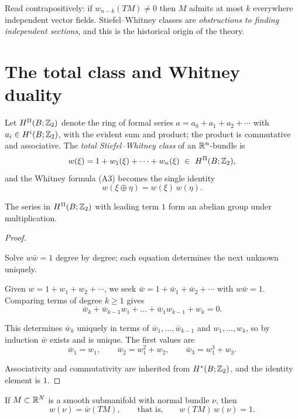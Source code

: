 \begin{remark}
Read contrapositively: if $w_{n-k}(TM)\neq0$ then $M$ admits at most $k$
everywhere independent vector fields. Stiefel--Whitney classes are
\emph{obstructions to finding independent sections}, and this is the historical
origin of the theory.
\end{remark}

\section{The total class and Whitney duality}

Let $H^{\Pi}(B;\mathbb{Z}_2)$ denote the ring of formal series
$a=a_0+a_1+a_2+\cdots$ with $a_i\in H^i(B;\mathbb{Z}_2)$, with the evident sum and
product; the product is commutative and associative. The \emph{total
Stiefel--Whitney class} of an $\mathbb{R}^n$-bundle is
\[
w(\xi)=1+w_1(\xi)+\dots+w_n(\xi)\ \in\ H^{\Pi}(B;\Z_2),
\]
and the Whitney formula (A3) becomes the single identity
\[
w(\xi\oplus\eta)=w(\xi)\,w(\eta).
\]

\begin{proposition}\label{prop:invertible}
The series in $H^\Pi(B;\mathbb{Z}_2)$ with leading term $1$ form an abelian group under
multiplication.
\end{proposition}

\begin{proof}
\begin{strategy}
Solve $w\bar w=1$ degree by degree; each equation determines the next unknown
uniquely.
\end{strategy}

 Given $w=1+w_1+w_2+\cdots$, we seek $\bar w=1+\bar w_1+\bar w_2+\cdots$
with $w\bar w=1$. Comparing terms of degree $k\ge1$ gives
\[
\bar w_k+\bar w_{k-1}w_1+\dots+\bar w_1 w_{k-1}+w_k=0 .
\]

 This determines $\bar w_k$ uniquely in terms of $\bar w_1,\dots,
\bar w_{k-1}$ and $w_1,\dots,w_k$, so by induction $\bar w$ exists and is
unique. The first values are
\[
\bar w_1=w_1,
\qquad
\bar w_2=w_1^2+w_2,
\qquad
\bar w_3=w_1^3+w_3 .
\]

 Associativity and commutativity are inherited from
$H^*(B;\mathbb{Z}_2)$, and the identity element is $1$.
\end{proof}

\begin{lemma}\label{lem:whitney-duality}
If $M\subset\mathbb{R}^N$ is a smooth submanifold with normal bundle $\nu$, then
\[
w(\nu)=\bar w(TM),
\qquad\text{that is,}\qquad
w(TM)\,w(\nu)=1 .
\]
\end{lemma}

